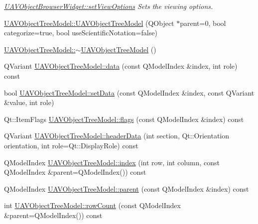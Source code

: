 \begin{DoxyCompactItemize}
\begin{DoxyCompactList}\small\item\em \hyperlink{group___u_a_v_object_browser_plugin_ga21f21843b8cf0310d7cac16dbb79846c}{\-U\-A\-V\-Object\-Browser\-Widget\-::set\-View\-Options} \-Sets the viewing options. \end{DoxyCompactList}\item 
\hyperlink{group___u_a_v_object_browser_plugin_ga7c48c4fa7c5b464e0127d929f8610964}{\-U\-A\-V\-Object\-Tree\-Model\-::\-U\-A\-V\-Object\-Tree\-Model} (\-Q\-Object $\ast$parent=0, bool categorize=true, bool use\-Scientific\-Notation=false)
\item 
\hyperlink{group___u_a_v_object_browser_plugin_ga162709965b0a670c87305d09bf3d5e76}{\-U\-A\-V\-Object\-Tree\-Model\-::$\sim$\-U\-A\-V\-Object\-Tree\-Model} ()
\item 
\-Q\-Variant \hyperlink{group___u_a_v_object_browser_plugin_ga7e2af1d5c89b55437fb74df890b24a53}{\-U\-A\-V\-Object\-Tree\-Model\-::data} (const \-Q\-Model\-Index \&index, int role) const 
\item 
bool \hyperlink{group___u_a_v_object_browser_plugin_ga3327e2ff6b418ae404a06d7c990fbc50}{\-U\-A\-V\-Object\-Tree\-Model\-::set\-Data} (const \-Q\-Model\-Index \&index, const \-Q\-Variant \&value, int role)
\item 
\-Qt\-::\-Item\-Flags \hyperlink{group___u_a_v_object_browser_plugin_ga16ae36c54433edd7b07439edc1264b59}{\-U\-A\-V\-Object\-Tree\-Model\-::flags} (const \-Q\-Model\-Index \&index) const 
\item 
\-Q\-Variant \hyperlink{group___u_a_v_object_browser_plugin_gaa19ce01eb026443086adfe5063bbc233}{\-U\-A\-V\-Object\-Tree\-Model\-::header\-Data} (int section, \-Qt\-::\-Orientation orientation, int role=\-Qt\-::\-Display\-Role) const 
\item 
\-Q\-Model\-Index \hyperlink{group___u_a_v_object_browser_plugin_ga9b9e52145b78d333effe586a41478701}{\-U\-A\-V\-Object\-Tree\-Model\-::index} (int row, int column, const \-Q\-Model\-Index \&parent=\-Q\-Model\-Index()) const 
\item 
\-Q\-Model\-Index \hyperlink{group___u_a_v_object_browser_plugin_ga8d23a2cd6d6b785179ebd12426f142e3}{\-U\-A\-V\-Object\-Tree\-Model\-::parent} (const \-Q\-Model\-Index \&index) const 
\item 
int \hyperlink{group___u_a_v_object_browser_plugin_ga77552bcb5a7016909e6de111fb100744}{\-U\-A\-V\-Object\-Tree\-Model\-::row\-Count} (const \-Q\-Model\-Index \&parent=\-Q\-Model\-Index()) const 
\item 

\end{DoxyCompactItemize}
